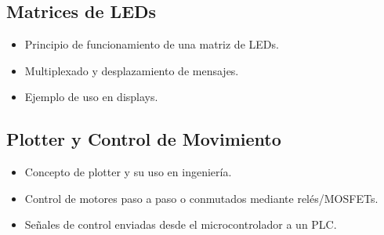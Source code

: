 \subsection{Matrices de LEDs}
\begin{itemize}
    \item Principio de funcionamiento de una matriz de LEDs.
    \item Multiplexado y desplazamiento de mensajes.
    \item Ejemplo de uso en displays.
\end{itemize}


\subsection{Plotter y Control de Movimiento}
\begin{itemize}
    \item Concepto de plotter y su uso en ingeniería.
    \item Control de motores paso a paso o conmutados mediante relés/MOSFETs.
    \item Señales de control enviadas desde el microcontrolador a un PLC.
\end{itemize}

